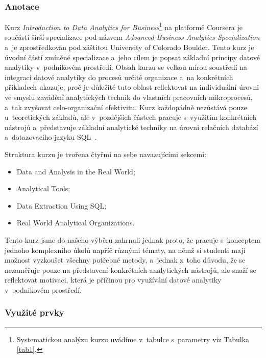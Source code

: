 \hypertarget{anotace}{%
\subsubsection{Anotace}\label{anotace}}

Kurz \emph{Introduction to Data Analytics for Business}\footnote{Systematickou analýzu kurzu uvádíme v~tabulce s~parametry viz Tabulka \ref{tab1}.} na platformě Coursera je součástí širší specializace pod názvem \emph{Advanced Business Analytics Specialization} a~je zprostředkován pod záštitou University of Colorado Boulder. Tento kurz je úvodní částí zmíněné specializace a~jeho cílem je popsat základní principy datové analytiky v~podnikovém prostředí. Obsah kurzu se velkou mírou soustředí na integraci datové analytiky do procesů určité organizace a~na konkrétních příkladech ukazuje, proč je důležité tuto oblast reflektovat na individuální úrovni ve smyslu zavádění analytických technik do vlastních pracovních mikroprocesů, a~tak zvyšovat celo-organizační efektivitu. Kurz každopádně nezůstává pouze u~teoretických základů, ale v~pozdějších částech pracuje s~využitím konkrétních nástrojů a~představuje základní analytické techniky na úrovni relačních databází a~dotazovacího jazyku SQL~\parencite{course1}.

Struktura kurzu je tvořena čtyřmi na sebe navazujícími sekcemi:

\begin{itemize}
\tightlist
\item
  Data and Analysis in the Real World;
\item
  Analytical Tools;
\item
  Data Extraction Using SQL;
\item
  Real World Analytical Organizations.
\end{itemize}

Tento kurz jsme do našeho výběru zahrnuli jednak proto, že pracuje s~konceptem jednoho komplexního úkolů napříč různými tématy, na němž si studenti mají možnost vyzkoušet všechny potřebné metody, a~jednak z~toho důvodu, že se nezaměřuje pouze na představení konkrétních analytických nástrojů, ale snaží se reflektovat motivaci, která je příčinou pro využívání datové analytiky v~podnikovém prostředí.

\hypertarget{vyuux17eituxe9-prvky}{%
\subsubsection{Využité prvky}\label{vyuux17eituxe9-prvky}}

